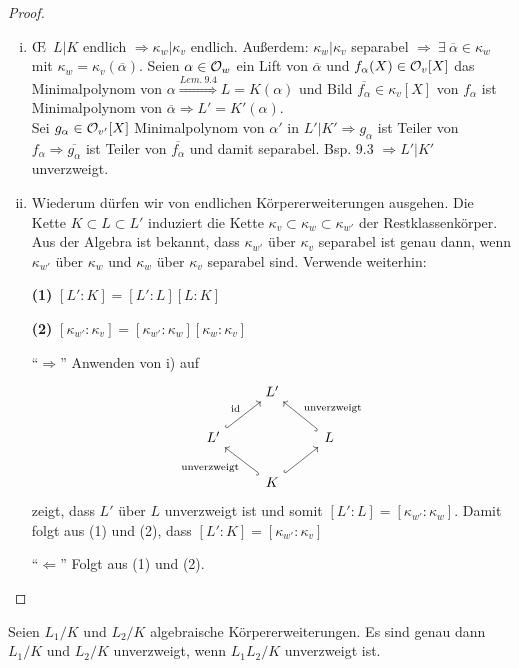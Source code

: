 
\begin{proof}
	\begin{enumerate}[i)]
		\item \OE \ $L|K$ endlich $\Rightarrow \kappa_w| \kappa_v$ endlich. Außerdem: $\kappa_w|\kappa_v$ separabel $\Rightarrow \ \exists \ \overline{\alpha} \in \kappa_w$ mit $\kappa_w=\kappa_v(\overline{\alpha})$. Seien $\alpha \in \mathcal{O}_w$ ein Lift von $\overline{\alpha}$ und $f_\alpha(X) \in \mathcal{O}_v[X]$ das Minimalpolynom von $\alpha \stackrel{Lem.\ 9.4}{\Longrightarrow} L=K(\alpha)$ und Bild $\overline{f_\alpha} \in \kappa_v[X]$ von $f_\alpha$ ist Minimalpolynom von $\overline{\alpha} \Rightarrow L'=K'(\alpha)$.\\
		Sei $g_\alpha \in \mathcal{O}_{v'}[X]$ Minimalpolynom von $\alpha'$ in $L'|K' \Rightarrow g_\alpha$ ist Teiler von $f_\alpha \Rightarrow \overline{g_\alpha}$ ist Teiler von $\overline{f_\alpha}$ und damit separabel. Bsp. 9.3 $\Rightarrow L'|K'$ unverzweigt.
		\item Wiederum dürfen wir von endlichen Körpererweiterungen ausgehen. Die Kette $K \subset L \subset L'$ induziert die Kette $\kappa_v \subset \kappa_w \subset \kappa_{w'}$ der Restklassenkörper.
		Aus der Algebra ist bekannt, dass $\kappa_{w'}$ über $\kappa_v$ separabel ist genau dann, wenn 
		$\kappa_{w'}$ über $\kappa_w$ und $\kappa_{w}$ über $\kappa_v$ separabel sind.
		Verwende weiterhin:
		
		\textbf{(1)} $[L':K] = [L':L] [L:K]$
		
		\textbf{(2)} $[\kappa_{w'}:\kappa_{v}] = [\kappa_{w'}:\kappa_{w}] [\kappa_{w}:\kappa_{v}]$
		
		\bigskip \enquote{$\Rightarrow$} Anwenden von i) auf
		\[\begin{tikzcd}
		& L' & \\
		L' 
		\arrow[hook]{ur}{\id}
		& & L 
		\arrow[hook, swap]{ul}{\text{unverzweigt}}
		\\
		& K 
		\arrow[hook]{ur}
		\arrow[hook]{ul}{\text{unverzweigt}}
		&
		\end{tikzcd}
		\]
		zeigt, dass $L'$ über $L$ unverzweigt ist und somit $[L':L] = [\kappa_{w'}:\kappa_{w}]$. Damit folgt aus (1) und (2), dass $[L':K] = [\kappa_{w'}:\kappa_{v}]$
		
		\bigskip \enquote{$\Leftarrow$} Folgt aus (1) und (2).
	\end{enumerate}
\end{proof}


\begin{Kor}
	Seien $L_1 /K$ und $L_2 /K$ algebraische Körpererweiterungen. Es sind genau dann $L_1/K$ und $L_2/K$ unverzweigt, wenn $L_1L_2/K$ unverzweigt ist.
\end{Kor}


